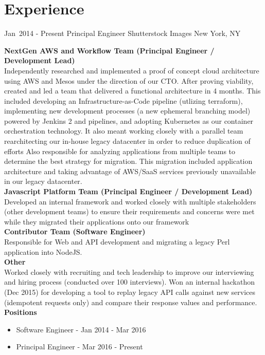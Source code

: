 \documentclass[11pt,letterpaper,sans]{moderncv}
\begin{document}
\makecvtitle

\section{Experience}
\cventry
{
\mbox{Jan 2014}
-
\mbox{Present}
}
{Principal Engineer}
{Shutterstock Images}
{New York, NY}
{}
{
\textbf{NextGen AWS and Workflow Team (Principal Engineer / Development Lead)} \\
Independently researched and implemented a proof of concept cloud architecture using AWS and Mesos under the direction of our CTO.
After proving viability, created and led a team that delivered a functional architecture in 4 months.
This included developing an Infrastructure-as-Code pipeline (utlizing terraform),
implementing new development processes (a new ephemeral branching model) powered by Jenkins 2 and pipelines,
and adopting Kubernetes as our container orchestration technology.
It also meant working closely with a parallel team rearchitecting our in-house legacy datacenter in order to reduce duplication of efforts
Also responsible for analyzing applications from multiple teams to determine the best strategy for migration.
This migration included application architecture and taking advantage of AWS/SaaS services previously unavailable in our legacy datacenter.
\\
\textbf{Javascript Platform Team (Principal Engineer / Development Lead)} \\
Developed an internal framework and worked closely with multiple stakeholders (other development teams) to ensure their requirements and concerns were met while they migrated their applications onto our framework
\\
\textbf{Contributor Team (Software Engineer)} \\
Responsible for Web and API development and migrating a legacy Perl application into NodeJS.
\\
\textbf{Other} \\
Worked closely with recruiting and tech leadership to improve our interviewing and hiring process (conducted over 100 interviews).
Won an internal hackathon (Dec 2015) for developing a tool to replay legacy API calls against new services (idempotent requests only) and compare their response values and performance.
\textbf{Positions}
\begin{itemize}
  \item Software Engineer - Jan 2014 - Mar 2016
  \item Principal Engineer - Mar 2016 - Present
\end{itemize}
}
\end{document}
